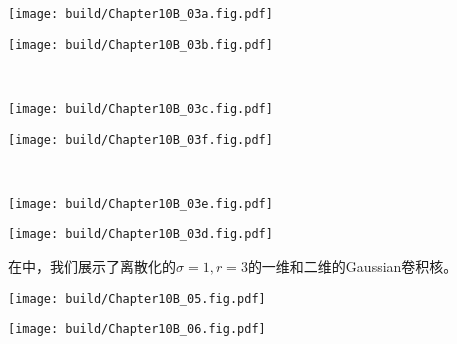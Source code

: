 \begin{Figure}[二维卷积核]
    \begin{FigureSub}[Box]
        \texttt{[image: build/Chapter10B\_03a.fig.pdf]}\hspace*{0.5cm}
    \end{FigureSub}\hspace{0.5cm}
    \begin{FigureSub}[Tent]
        \texttt{[image: build/Chapter10B\_03b.fig.pdf]}\hspace*{0.5cm}
    \end{FigureSub}\\ \vspace{0.1cm}
    \begin{FigureSub}[Gaussian]
        \texttt{[image: build/Chapter10B\_03c.fig.pdf]}\hspace*{0.5cm}
    \end{FigureSub}\hspace{0.5cm}
    \begin{FigureSub}
        \texttt{[image: build/Chapter10B\_03f.fig.pdf]}\hspace*{0.5cm}
    \end{FigureSub}\\ \vspace{0.1cm}
    \begin{FigureSub}
        \texttt{[image: build/Chapter10B\_03e.fig.pdf]}\hspace*{0.5cm}
    \end{FigureSub}\hspace{0.5cm}
    \begin{FigureSub}
        \texttt{[image: build/Chapter10B\_03d.fig.pdf]}\hspace*{0.5cm}
    \end{FigureSub}
\end{Figure}
在中，我们展示了离散化的$\sigma=1,r=3$的一维和二维的Gaussian卷积核。

\begin{Figure}[离散Gaussian卷积核]
    \begin{FigureSub}[一维离散Gaussian卷积核]
        \hspace*{2cm}
        \texttt{[image: build/Chapter10B\_05.fig.pdf]}
        \hspace*{2cm}
    \end{FigureSub}\hspace{1cm}
    \begin{FigureSub}[二维离散Gaussian卷积核]
        \texttt{[image: build/Chapter10B\_06.fig.pdf]}
    \end{FigureSub}
\end{Figure}

